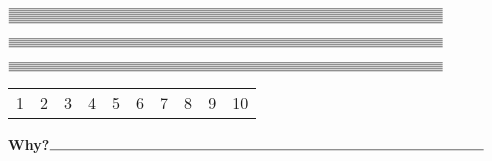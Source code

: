 \mypage
\begin{mybox}[width=\textwidth,title={Reflection: Highlights}]
\begin{center}
    $\rule{0.9\textwidth}{0.15mm}$\\
    $\rule{0.9\textwidth}{0.15mm}$\\
    $\rule{0.9\textwidth}{0.15mm}$\\
    $\rule{0.9\textwidth}{0.15mm}$\\
    $\rule{0.9\textwidth}{0.15mm}$\\
    $\rule{0.9\textwidth}{0.15mm}$\\
    $\rule{0.9\textwidth}{0.15mm}$\\
    $\rule{0.9\textwidth}{0.15mm}$
    \end{center}
\end{mybox}

\begin{mybox}[width=\textwidth,title={Reflection: A lesson for next time}]
\begin{center}
    $\rule{0.9\textwidth}{0.15mm}$\\
    $\rule{0.9\textwidth}{0.15mm}$\\
    $\rule{0.9\textwidth}{0.15mm}$\\
    $\rule{0.9\textwidth}{0.15mm}$\\
    $\rule{0.9\textwidth}{0.15mm}$
    \end{center}
\end{mybox}

\begin{mybox}[width=\textwidth,title={Reflection: Targeted Question (see ``Other Resources'')}]
\begin{center}
    $\rule{0.9\textwidth}{0.15mm}$\\
    $\rule{0.9\textwidth}{0.15mm}$\\
    $\rule{0.9\textwidth}{0.15mm}$\\
    $\rule{0.9\textwidth}{0.15mm}$\\
    $\rule{0.9\textwidth}{0.15mm}$
    \end{center}
\end{mybox}

\begin{ratebox}[width=\textwidth,title={Did it live up to my expectations?}]
  \begin{center}
    \begin{tabular}{cccccccccc}
      1&2&3&4&5&6&7&8&9&10
    \end{tabular}
  \textbf{Why?}$\rule{0.9\textwidth}{0.15mm}$
  \end{center}
\end{ratebox}


